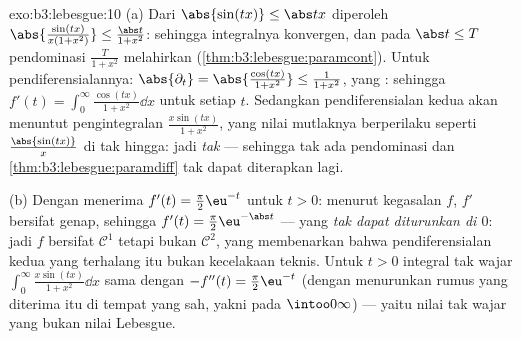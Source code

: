\begin{solution}{exo:b3:lebesgue:10}
(a) Dari $\abs{\sin(tx)} \leq \abs tx$ diperoleh
$\abs{\frac{\sin(tx)}{x(1+x^2)}} \leq \frac{\abs
t}{1+x^2}$: sehingga integralnya konvergen, dan pada $\abs t \leq T$
pendominasi $\frac{T}{1+x^2}$ melahirkan 
(\cref{thm:b3:lebesgue:paramcont}). Untuk pendiferensialannya:
$\abs{\partial_t} = \abs{\frac{\cos(tx)}{1+x^2}} \leq
\frac1{1+x^2}$, yang : sehingga $f'(t) =
\int_0^\infty\frac{\cos(tx)}{1+x^2}\dd x$ untuk setiap $t$. Sedangkan pendiferensialan
kedua akan menuntut pengintegralan $\frac{x\sin(tx)}{1 +
x^2}$, yang nilai mutlaknya berperilaku seperti $\frac{\abs{\sin(tx)}}
x$ di tak hingga: jadi \emph{tak}  --- sehingga tak ada pendominasi
dan \cref{thm:b3:lebesgue:paramdiff} tak dapat diterapkan lagi.

(b) Dengan menerima $f'(t) = \frac\pi2\eu^{-t}$ untuk $t > 0$: menurut
kegasalan $f$, $f'$ bersifat genap, sehingga $f'(t) =
\frac\pi2\eu^{-\abs t}$ --- yang \emph{tak dapat diturunkan
di $0$}: jadi $f$ bersifat $\mathcal C^1$ tetapi bukan $\mathcal C^2$,
yang membenarkan bahwa pendiferensialan kedua yang terhalang itu bukan
kecelakaan teknis. Untuk $t > 0$ integral tak wajar
$\int_0^\infty\frac{x\sin(tx)}{1+x^2}\dd x$ sama dengan $-f''(t) =
\frac\pi2\eu^{-t}$ (dengan menurunkan rumus yang diterima itu di tempat
yang sah, yakni pada $\intoo0\infty$) --- yaitu nilai tak wajar
yang bukan nilai Lebesgue.
\end{solution}

